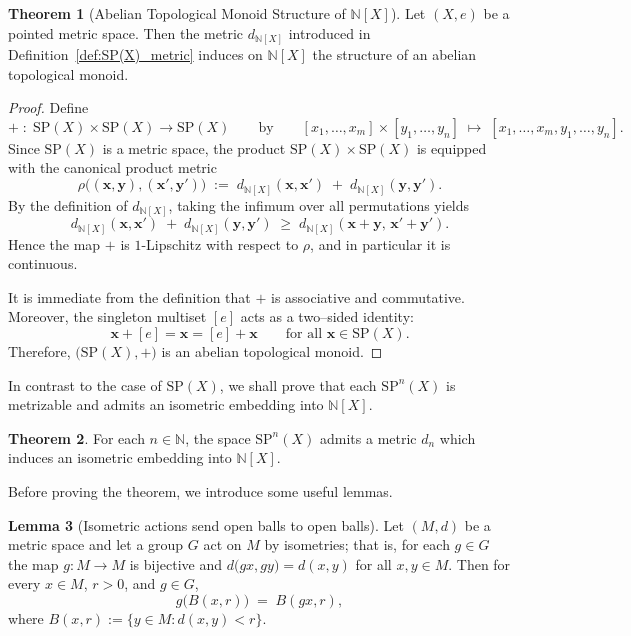 \documentclass[10pt,a4paper]{article}
\theoremstyle{definition}
\newtheorem{theorem}{Theorem}[section]
\newtheorem{lemma}[theorem]{Lemma}
\newcommand{\SP}{\mathrm{SP}}
\newcommand{\N}{\mathbb{N}}
\begin{document}
\begin{theorem}[Abelian Topological Monoid Structure of {$\N[X]$}]
\label{thm:N[X]_top_monoid}
Let $(X,e)$ be a pointed metric space.  
Then the metric $d_{\N[X]}$ introduced in
Definition~\ref{def:SP(X)_metric} induces on $\N[X]$ the structure of an
abelian topological monoid.
\end{theorem}
\begin{proof}
    Define
    \[
    +\;:\; \SP(X) \times \SP(X) \longrightarrow \SP(X)
    \qquad\text{by}\qquad
    [x_1,\ldots,x_m] \times [y_1,\ldots,y_n]
    \;\longmapsto\;
    [x_1,\ldots,x_m,y_1,\ldots,y_n].
    \]
    Since $\SP(X)$ is a metric space, the product $\SP(X) \times \SP(X)$ is
    equipped with the canonical product metric
    \[
    \rho\!\bigl((\mathbf{x},\mathbf{y}),(\mathbf{x}',\mathbf{y}')\bigr)
    \;:=\;
    d_{\N[X]}(\mathbf{x},\mathbf{x}') \;+\; d_{\N[X]}(\mathbf{y},\mathbf{y}').
    \]
    By the definition of $d_{\N[X]}$, taking the infimum over all permutations yields
    \[
    d_{\N[X]}(\mathbf{x},\mathbf{x}')
    \;+\;
    d_{\N[X]}(\mathbf{y},\mathbf{y}')
    \;\geq\;
    d_{\N[X]}(\mathbf{x}+\mathbf{y},\,\mathbf{x}'+\mathbf{y}').
    \]
    Hence the map $+$ is $1$-Lipschitz with respect to $\rho$, and in particular
    it is continuous. 

    It is immediate from the definition that $+$ is associative and commutative.
    Moreover, the singleton multiset $[e]$ acts as a two--sided identity:
    \[
    \mathbf{x} + [e] = \mathbf{x} = [e] + \mathbf{x}
    \qquad
    \text{for all } \mathbf{x} \in \SP(X).
    \]
    Therefore, $\bigl(\SP(X),+\bigr)$ is an abelian topological monoid.
\end{proof}



In contrast to the case of $\SP(X)$, we shall prove that each $\SP^n(X)$ is
metrizable and admits an isometric embedding into $\N[X]$.

\begin{theorem}\label{thm:SPn_iso_embed}
For each $n \in \N$, the space $\SP^{n}(X)$ admits a metric $d_n$ which
induces an isometric embedding into $\N[X]$.
\end{theorem}
Before proving the theorem, we introduce some useful lemmas.

\begin{lemma}[Isometric actions send open balls to open balls]\label{lem:isometric_action_balls}
Let $(M,d)$ be a metric space and let a group $G$ act on $M$ by isometries;
that is, for each $g\in G$ the map $g\colon M\to M$ is bijective and
$d\bigl(gx,gy\bigr)=d(x,y)$ for all $x,y\in M$. Then for every $x\in M$,
$r>0$, and $g\in G$,
\[
g\bigl(B(x,r)\bigr)\;=\;B(gx,r),
\]
where $B(x,r):=\{y\in M: d(x,y)<r\}$.
\end{lemma}
\end{document}

